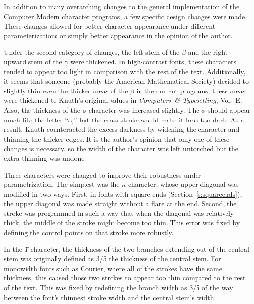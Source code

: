 
In addition to many overarching changes to the general implementation of the
Computer Modern character programs, a few specific design changes were made.
These changes allowed for better character appearance under different
parameterizations or simply better appearance in the opinion of the author.

Under the second category of changes, the left stem of the $\beta$ and the right
upward stem of the $\gamma$ were thickened. In high-contrast fonts, these
characters tended to appear too light in comparison with the rest of the text.
Additionally, it seems that someone (probably the American Mathematical Society)
decided to slightly thin even the thicker areas of the $\beta$ in the current
programs; these areas were thickened to Knuth's original values in
\emph{Computers~\& Typesetting}, Vol.~E\@. Also, the thickness of the $\phi$
character was increased slightly. The $\phi$ should appear much like the letter
``o,'' but the cross-stroke would make it look too dark. As a result, Knuth
counteracted the excess darkness by widening the character and thinning the
thicker edges. It is the author's opinion that only one of these changes is
necessary, so the width of the character was left untouched but the extra
thinning was undone.

Three characters were changed to improve their robustness under parametrization.
The simplest was the $\kappa$ character, whose upper diagonal was modified in
two ways. First, in fonts with square ends (Section~\ref{s:squareends}), the
upper diagonal was made straight without a flare at the end. Second, the stroke
was programmed in such a way that when the diagonal was relatively thick, the
middle of the stroke might become too thin. This error was fixed by defining the
control points on that stroke more robustly.

In the $\Upsilon$ character, the thickness of the two branches extending out of
the central stem was originally defined as 3/5 the thickness of the central
stem. For monowidth fonts such as Courier, where all of the strokes have the
same thickness, this caused those two strokes to appear too thin compared to the
rest of the text. This was fixed by redefining the branch width as 3/5 of the
way between the font's thinnest stroke width and the central stem's width.

